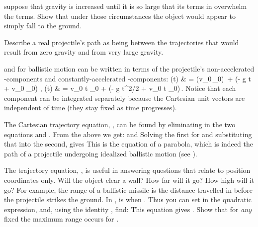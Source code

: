 {\tryit suppose that gravity is increased until it is so large that its terms in
 overwhelm the  terms.  Show that under those circumstances
the object would appear to simply fall to the ground.

\tryit Describe a real projectile's path as being between the trajectories
that would result from zero gravity and from very large gravity.

 and  for ballistic motion can be written in terms
of the projectile's non-accelerated -components and constantly-accelerated
-components:
%
            {(t) & = (v_0\,\cos\theta_0)\,  + (- g t + v_0 \sin\theta_0)\,\,,}
            {(t) & = v_0 t \cos\theta_0  + (- g t^2/2 + v_0 t \sin\theta_0)\,.}
%
Notice that each component can be integrated separately because the Cartesian unit vectors
are independent of time (they stay fixed as time progresses).

The Cartesian trajectory equation, , can be found by eliminating  in the two equations
 and .
From the above we get:
%
%
and
%
%
Solving the first for  and substituting that into the second, gives
%
%
This is the equation of a parabola, which is indeed the path of a
projectile undergoing idealized ballistic motion
(see ).


The trajectory equation, , is useful in answering questions that relate
to position coordinates only.
Will the object clear a wall?
How far will it go?
How high will it go?
For example, the range  of a ballistic missile is the distance travelled
in  before the projectile strikes the ground.
In ,  is  when .
Thus you can set  in the quadratic expression,
%
%
and, using the identity \m{\sin 2\theta = 2 \sin\theta \cos\theta}, find:
%
%
\BlackTriangle This equation gives .
Show that for \textit{any} fixed  the maximum range occurs for
\m{\theta = 45\degrees}.

}
